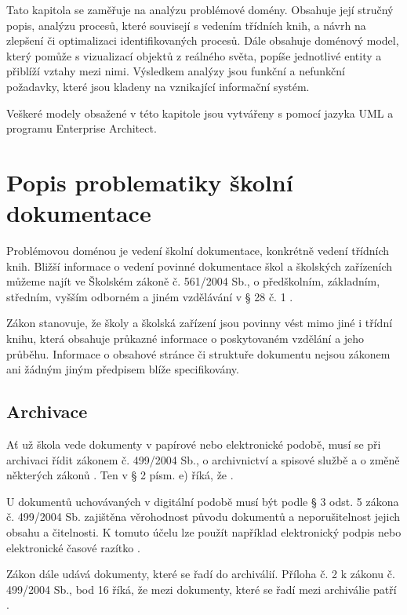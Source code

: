 Tato kapitola se zaměřuje na analýzu problémové domény. Obsahuje její struč\-ný popis, analýzu procesů, které souvisejí s vedením třídních knih, a návrh na zlepšení či optimalizaci identifikovaných procesů. Dále obsahuje doménový model, který pomůže s vizualizací objektů z reálného světa, popíše jednotlivé entity a přiblíží vztahy mezi nimi. Výsledkem analýzy jsou funkční a nefunkční požadavky, které jsou kladeny na vznikající informační systém.

Veškeré modely obsažené v této kapitole jsou vytvářeny s pomocí jazyka UML a programu Enterprise Architect.

\section{Popis problematiky školní dokumentace}
Problémovou doménou je vedení školní dokumentace, konkrétně vedení třídních knih. Bližší informace o vedení povinné dokumentace škol a školských zařízeních můžeme najít ve Školském zákoně č. 561/2004 Sb., o předškolním, základním, středním, vyšším odborném a jiném vzdělávání v § 28 č. 1 \cite{zk561}.

Zákon stanovuje, že školy a školská zařízení jsou povinny vést mimo jiné i třídní knihu, která obsahuje průkazné informace o poskytovaném vzdělání a jeho průběhu. Informace o obsahové stránce či struktuře dokumentu nejsou zákonem ani žádným jiným předpisem blíže specifikovány. \cite{zk561}

\subsection{Archivace}
Ať už škola vede dokumenty v papírové nebo elektronické podobě, musí se při archivaci řídit zákonem č. 499/2004 Sb., o archivnictví a spisové službě a o změně některých zákonů \cite{zk499}. Ten v § 2 písm. e) říká, že .

U dokumentů uchovávaných v digitální podobě musí být podle § 3 odst. 5 zákona č. 499/2004 Sb. zajištěna věrohodnost původu dokumentů a neporušitelnost jejich obsahu a čitelnosti. K tomuto účelu lze použít například elektronický podpis nebo elektronické časové razítko \cite{zk499}.

Zákon dále udává dokumenty, které se řadí do archiválií. Příloha č. 2 k zákonu č. 499/2004 Sb., bod 16 říká, že mezi dokumenty, které se řadí mezi archiválie patří .

